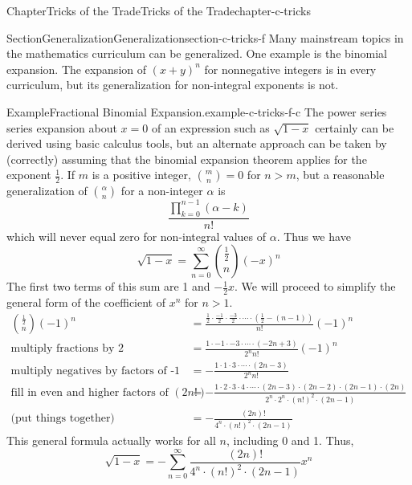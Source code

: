 \documentclass[oneside,10pt,]{book}
\numberwithin{equation}{section}
\newcommand{\gt}{>}
\begin{document}
\begin{chapterptx}{Chapter}{Tricks of the Trade}{}{Tricks of the Trade}{}{}{chapter-c-tricks}
\begin{sectionptx}{Section}{Generalization}{}{Generalization}{}{}{section-c-tricks-f}
Many mainstream topics in the mathematics curriculum can be generalized. One example is the binomial expansion.  The expansion of \((x+y)^n\) for nonnegative integers is in every curriculum, but its generalization for non-integral exponents is not.%
\begin{example}{Example}{Fractional Binomial Expansion.}{example-c-tricks-f-c}%
%
The power series series expansion about \(x=0\) of an expression such as \(\sqrt{1-x}\) certainly can be derived using basic calculus tools, but an alternate approach can be taken by (correctly) assuming that the binomial expansion theorem applies for the exponent \(\frac{1}{2}\).  If \(m\) is a positive integer, \(\binom{m}{n} =0\) for \(n \gt m\), but a reasonable generalization of \(\binom{\alpha}{n}\) for a non-integer \(\alpha\) is%
\begin{equation*}
\frac{\prod_{k=0}^{n-1} (\alpha-k)}{n!}
\end{equation*}
which will never equal zero for non-integral values of \(\alpha\).  Thus we have%
\begin{equation*}
\sqrt{1-x} = \sum_{n=0}^{\infty} \binom{\frac{1}{2}}{n} (-x)^n
\end{equation*}
The first two terms of this sum are 1 and \(-\frac{1}{2} x\). We will proceed to simplify the general form of the coefficient of \(x^n\) for \(n \gt 1\).%
\begin{equation*}
\begin{split}
\binom{\frac{1}{2}}{n} (-1)^n
&=  \frac{\frac{1}{2} \cdot\frac{-1}{2}\cdot\frac{-3}{2}\cdot \cdots \cdot(\frac{1}{2}-(n-1)) }{n!} (-1)^n\\
\textrm{multiply fractions by 2 }	&=  \frac{1 \cdot -1 \cdot -3 \cdot \cdots \cdot (-2n+3)}{2^{n} n!} (-1)^n\\
\textrm{multiply negatives by factors of -1}	&= - \frac{1 \cdot 1 \cdot 3 \cdot \cdots \cdot (2n-3)}{2^{n} n!}  \\
\textrm{fill in even and higher factors of }(2n!)	&= - \frac{ 1 \cdot 2 \cdot 3\cdot 4 \cdot \cdots \cdot (2n-3)\cdot (2n-2)\cdot (2n-1)\cdot (2n)}{2^n\cdot 2^n\cdot (n!)^2 \cdot (2n-1)}  \\
\textrm{(put things together)}	&= - \frac{(2n)!}{4^n \cdot(n!)^2\cdot (2n-1)} 
\end{split}
\end{equation*}
This general formula actually works for all \(n\), including 0 and 1.   Thus,%
\begin{equation*}
\sqrt{1-x}  = - \sum_{n=0}^{\infty} \frac{(2n)!}{4^n \cdot(n!)^2\cdot (2n-1)}  x^n  

\end{equation*}
\end{example}
\end{sectionptx}
\end{chapterptx}
\end{document}
